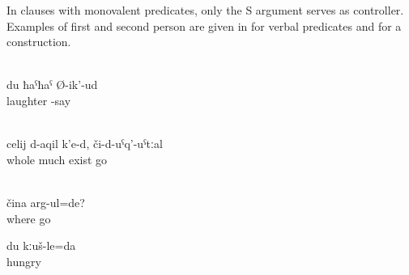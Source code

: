In clauses with monovalent predicates, only the S argument serves as controller. Examples of first and second person are given in  for verbal predicates and  for a  construction.
%
\begin{exe}
		\\	\label{ex:I (masc.) laugh habitual present}
		\gll	du 	ħaˁħaˁ 		Ø-ik'-ud\\
			 	laughter	-say\\
		\glt	{}

		\\	\label{ex:There is much there, if you go there realis conditional}
		\gll	celij 	d-aqil	k'e-d,	či-d-uˁq'-uˁtːal\\
			whole	much	exist	go\\
		\glt	{}

		\\	\label{ex:Where are you going compound present}
		\gll	čina	arg-ul=de?\\
			where	go\\
		\glt	{}

	\ex	\label{ex:I am hungry agreement rules}
	\gll	du	kːuš-le=da\\
			hungry\\
	\glt	{}
\end{exe}

